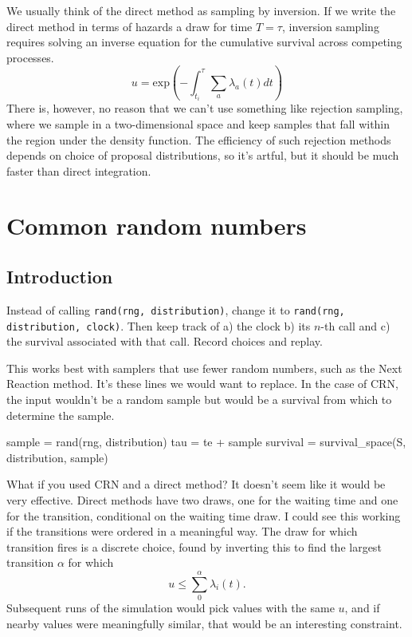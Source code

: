 \documentclass{article}
\begin{document}
We usually think of the direct method as sampling by inversion. If we write the direct method in terms of hazards a draw for time $T=\tau$, inversion sampling requires solving an inverse equation for the cumulative survival across competing processes.
\begin{equation}
	u = \mbox{exp}\left(-\int_{t_i}^\tau\sum_a \lambda_a(t)dt\right)
\end{equation}
There is, however, no reason that we can't use something like rejection sampling, where we sample in a two-dimensional space and keep samples that fall within the region under the density function. The efficiency of such rejection methods depends on choice of proposal distributions, so it's artful, but it should be much faster than direct integration.


\section{Common random numbers}

\subsection{Introduction}

Instead of calling \texttt{rand(rng, distribution)}, change it to \texttt{rand(rng, distribution, clock)}. Then keep track of a) the clock b) its $n$-th call and c) the survival associated with that call. Record choices and replay.

This works best with samplers that use fewer random numbers, such as the Next Reaction method. It's these lines we would want to replace. In the case of CRN, the input wouldn't be a random sample but would be a survival from which to determine the sample.

\begin{jllisting}
sample = rand(rng, distribution)
tau = te + sample
survival = survival_space(S, distribution, sample)
\end{jllisting}

What if you used CRN and a direct method? It doesn't seem like it would be very effective. Direct methods have two draws, one for the waiting time and one for the transition, conditional on the waiting time draw. I could see this working if the transitions were ordered in a meaningful way. The draw for which transition fires is a discrete choice, found by inverting this to find the largest transition $\alpha$ for which
\begin{equation}
	u \le \sum_{0}^{\alpha}\lambda_i(t).
\end{equation}
Subsequent runs of the simulation would pick values with the same $u$, and if nearby values were meaningfully similar, that would be an interesting constraint.
\end{document}
